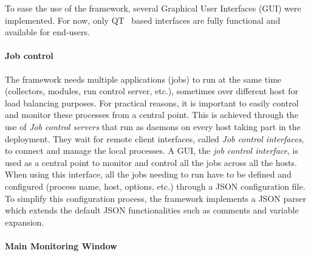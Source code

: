 \documentclass{webofc}
\begin{document}
To ease the use of the framework, several Graphical User Interfaces (GUI) were implemented.
For now, only QT~\cite{QT} based interfaces are fully functional and available for end-users.

\paragraph{Job control}\label{par:JobControl}

The framework needs multiple applications (jobs) to run at the same time (collectors, modules, run control server, etc.), sometimes over different host for load balancing purposes.
For practical reasons, it is important to easily control and monitor these processes from a central point.
This is achieved through the use of \textit{Job control servers} that run as daemons on every host taking part in the deployment.
They wait for remote client interfaces, called \textit{Job control interfaces}, to connect and manage the local processes.
A GUI, the \textit{job control interface}, is used as a central point to monitor and control all the jobs across all the hosts.
When using this interface, all the jobs needing to run have to be defined and configured (process name, host, options, etc.) through a JSON configuration file.
To simplify this configuration process, the framework implements a JSON parser which extends the default JSON functionalities such as comments and variable expansion.

\paragraph{Main Monitoring Window}\label{par:MainGUI}
\end{document}
